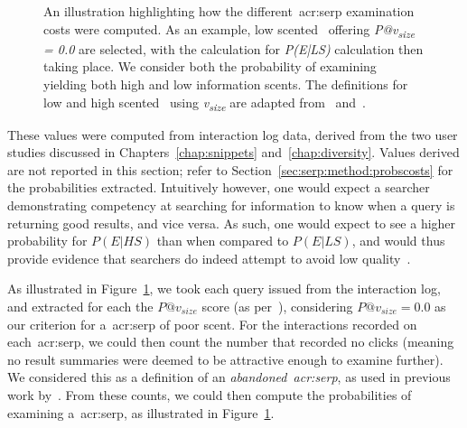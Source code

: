 \begin{figure}[t!]
    \centering
    \caption[Computing~\gls{acr:serp} examination probabilities]{An illustration highlighting how the different~\gls{acr:serp} examination costs were computed. As an example, low scented~ offering \emph{P@v\textsubscript{size} = 0.0} are selected, with the calculation for \emph{P(E|LS)} calculation then taking place. We consider both the probability of examining~ yielding both high and low information scents. The definitions for low and high scented~ using \emph{v\textsubscript{size}} are adapted from~\cite{wu2014information_scent} and~\cite{hassan2013serp_abandonment}.}
    \label{fig:serp_probabilities}
\end{figure}

These values were computed from interaction log data, derived from the two user studies discussed in Chapters~\ref{chap:snippets} and~\ref{chap:diversity}. Values derived are not reported in this section; refer to Section~\ref{sec:serp:method:probscosts} for the probabilities extracted. Intuitively however, one would expect a searcher demonstrating competency at searching for information to know when a query is returning good results, and vice versa. As such, one would expect to see a higher probability for $P(E|HS)$ than when compared to $P(E|LS)$, and would thus provide evidence that searchers do indeed attempt to avoid low quality~.

As illustrated in Figure~\ref{fig:serp_probabilities}, we took each query issued from the interaction log, and extracted for each the $P@v_{size}$ score (as per~\cite{wu2014information_scent}), considering $P@v_{size}=0.0$ as our criterion for a~\gls{acr:serp} of poor scent. For the interactions recorded on each~\gls{acr:serp}, we could then count the number that recorded no clicks (meaning no result summaries were deemed to be attractive enough to examine further). We considered this as a definition of an \emph{abandoned~\gls{acr:serp}}, as used in previous work by~\cite{hassan2013serp_abandonment}. From these counts, we could then compute the probabilities of examining a~\gls{acr:serp}, as illustrated in Figure~\ref{fig:serp_probabilities}.

